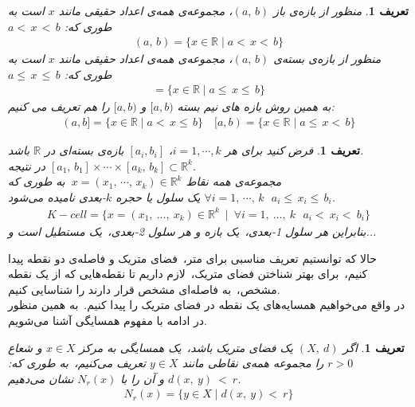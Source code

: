 \documentclass[12pt]{book}
\newtheorem{df}[thm]{\textbf{تعریف}}
\begin{document}
	\begin{df}\label{Def2: Intervals}
		منظور از بازه‌ی باز \( (a,\, b) \)، مجموعه‌ی همه‌ی اعداد حقیقی مانند \( x \) است به طوری که:‌\quad 
		\( a <\, x\, <\, b \)
		\begin{align}
			(a,\, b) = \{x \in \mathbb{R} \mid a <\, x <\, b\}
		\end{align}
		منظور از بازه‌ی بسته‌ی \( (a,\, b) \)، مجموعه‌ی همه‌ی اعداد حقیقی مانند \( x \) است به طوری که:‌\quad 
		\( a \leq \, x\, \leq \, b \)
		\begin{align}
			[a,\, b] = \{x \in \mathbb{R} \mid a \leq\, x \leq\, b\}
		\end{align}
	به همین روش بازه های نیم بسته \( [a, b) \) و \( [a, b) \) را هم تعریف می کنیم:
		\begin{align}
			(a, b] = \{x \in \mathbb{R} \mid a <\, x \leq\, b\} \quad 
			[a, b) = \{x \in \mathbb{R} \mid a \leq\, x <‌\, b \}
		\end{align}
	\end{df}

	\begin{df}\label{Def3: k-cell}
		فرض کنید برای هر \(i = 1,\cdots, k\)،‌ \( [a_i, b_i] \) بازه‌ی بسته‌ای در \( \mathbb{R} \) باشد.\\
		در نتیجه
		\( [a_1,\, b_1] \times \cdots \times [a_k,\, b_k] \subset \mathbb{R}^k \).\\
		مجموعه‌ی همه نقاط 
		\(\ x = (x_1,\,\cdots,\, x_k) \in \mathbb{R}^k \)
		به طوری که
		\( \forall i = 1,\, \cdots ,\, k \ \ \  a_i \leq\, x_i \leq\, b_i \)
		یک سلول یا حجره \(k\)-بعدی نامیده می‌شود.\\
		\begin{align}
			K-cell = \{ x = (x_1,\ \ldots,\ x_k) \in \mathbb{R}^k\ \mid\ \forall i = 1,\ \ldots,\ k \ \ \ a_i<\ x_i<\ b_i \}
		\end{align}
		بنابراین هر سلول 1-بعدی،\ ‌یک بازه و هر سلول 2-بعدی،\  یک مستطیل است و...
	\end{df}
	
	\noindent
	حالا که توانستیم تعریف مناسبی برای متر،‌\ فضای متریک و فاصله‌ی دو نقطه پیدا کنیم،‌\ برای بهتر شناختن فضای متریک،\ لازم داریم تا نقطه‌هایی که از یک نقطه مشخص،\ به فاصله‌ای مشخص قرار دارند را شناسایی کنیم.\\
	در واقع می‌خواهیم همسایه‌های یک نقطه در فضای متریک را پیدا کنیم.\ به همین منظور در ادامه با مفهوم همسایگی آشنا می‌شویم.
	\begin{df}\label{Def4: Neighborhood}
		اگر \( (X,\ d) \) یک فضای متریک باشد،‌\ یک همسایگی به مرکز \( x \in X \) و شعاع \( r>0 \) را مجموعه همه‌ی نقاطی مانند \( y \in X \) تعریف می‌کنیم،\ به طوری که: 
		\( d(x,\ y)\ <\ r \) و آن را با 
		\( N_r(x) \) نشان می‌دهیم.
		\begin{align}
			N_r(x) = \{ y \in X \mid d(x,\ y) <\ r \}
		\end{align}
	\end{df}
\end{document}

